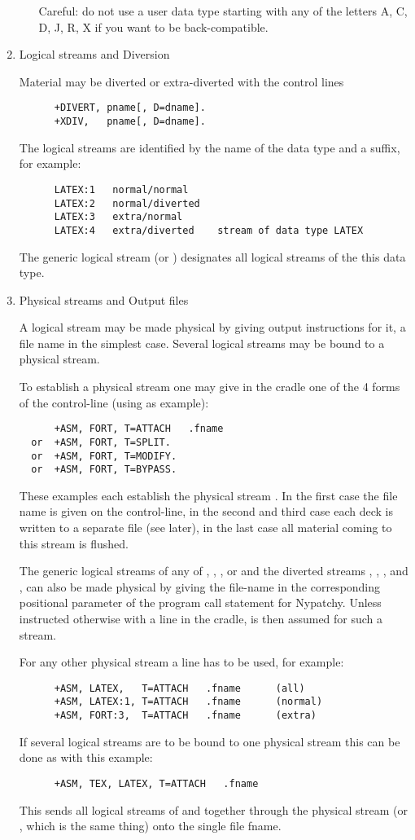 \begin{enumerate}
\begin{itemize}
   Careful: do not use a user data type starting with any of the
   letters A, C, D, J, R, X if you want to be back-compatible.
\end{itemize}
\item
Logical streams and Diversion

Material may be diverted or extra-diverted with the control lines
\begin{verbatim}
      +DIVERT, pname[, D=dname].
      +XDIV,   pname[, D=dname].
\end{verbatim}
The logical streams are identified by the name of the data type
and a suffix, for example:
\begin{verbatim}
      LATEX:1   normal/normal
      LATEX:2   normal/diverted
      LATEX:3   extra/normal
      LATEX:4   extra/diverted    stream of data type LATEX
\end{verbatim}
The generic logical stream  (or ) designates all
logical streams of the this data type.


\item
Physical streams and Output files

A logical stream may be made physical by giving output instructions for it,
a file name in the simplest case. Several logical streams may be bound to
a physical stream.

To establish a physical stream one may give in the cradle one of the
4 forms of the control-line  (using  as example):
\begin{verbatim}
      +ASM, FORT, T=ATTACH   .fname
  or  +ASM, FORT, T=SPLIT.
  or  +ASM, FORT, T=MODIFY.
  or  +ASM, FORT, T=BYPASS.
\end{verbatim}
These examples each establish the physical stream . In the
first case the file name is given on the control-line, in the second
and third case each deck is written to a separate file (see later),
in the last case all material coming to this stream is flushed.

The generic logical streams of any of , , ,
or  and the
diverted streams , , , and ,
can also be made
physical by giving the file-name in the corresponding positional
parameter of the program call statement for Nypatchy. Unless instructed
otherwise with a  line in the cradle,  is then assumed
for such a stream.

For any other physical stream a  line has to be used, for example:
\begin{verbatim}
      +ASM, LATEX,   T=ATTACH   .fname      (all)
      +ASM, LATEX:1, T=ATTACH   .fname      (normal)
      +ASM, FORT:3,  T=ATTACH   .fname      (extra)
\end{verbatim}
If several logical streams are to be bound to one physical stream this
can be done as with this example:
\begin{verbatim}
      +ASM, TEX, LATEX, T=ATTACH   .fname
\end{verbatim}
This sends all logical streams of  and  together
through the physical stream  (or , which is the
same thing) onto the single file fname.


\end{enumerate}
